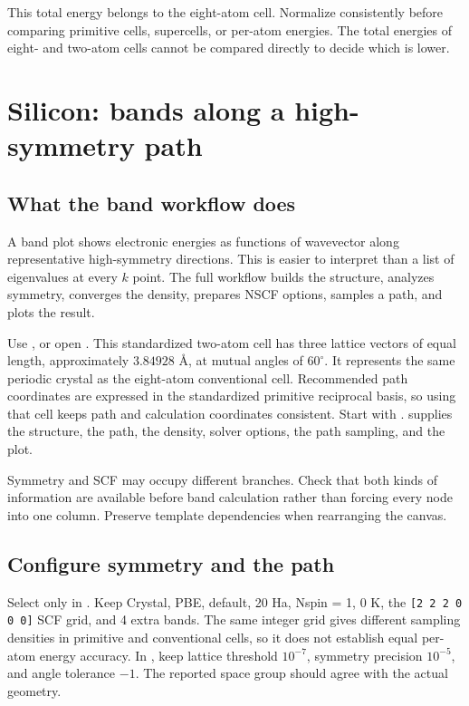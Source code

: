 This total energy belongs to the eight-atom cell. Normalize consistently before comparing primitive cells, supercells, or per-atom energies. The total energies of eight- and two-atom cells cannot be compared directly to decide which is lower.

\section{Silicon: bands along a high-symmetry path}

\subsection{What the band workflow does}

A band plot shows electronic energies as functions of wavevector along representative high-symmetry directions. This is easier to interpret than a list of eigenvalues at every $k$ point. The full workflow builds the structure, analyzes symmetry, converges the density, prepares NSCF options, samples a path, and plots the result.

Use , or open . This standardized two-atom cell has three lattice vectors of equal length, approximately $3.84928$ Å, at mutual angles of $60^\circ$. It represents the same periodic crystal as the eight-atom conventional cell. Recommended path coordinates are expressed in the standardized primitive reciprocal basis, so using that cell keeps path and calculation coordinates consistent. Start with .  supplies the structure,  the path,  the density,  solver options,  the path sampling, and  the plot.

Symmetry and SCF may occupy different branches. Check that both kinds of information are available before band calculation rather than forcing every node into one column. Preserve template dependencies when rearranging the canvas.

\subsection{Configure symmetry and the path}

Select only  in . Keep Crystal, PBE, default, 20 Ha, Nspin = 1, 0 K, the \mbox{\texttt{[2 2 2 0 0 0]}} SCF grid, and 4 extra bands. The same integer grid gives different sampling densities in primitive and conventional cells, so it does not establish equal per-atom energy accuracy. In , keep lattice threshold $10^{-7}$, symmetry precision $10^{-5}$, and angle tolerance $-1$. The reported space group should agree with the actual geometry.

